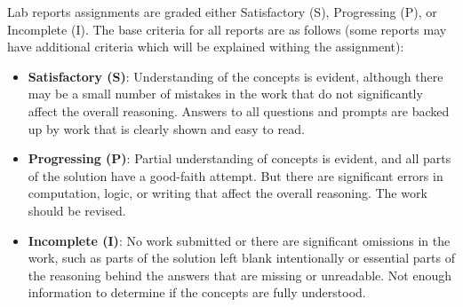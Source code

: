 Lab reports assignments are graded either Satisfactory (S), Progressing
(P), or Incomplete (I). The base criteria for all reports are as follows
(some reports may have additional criteria which will be explained
withing the assignment):

\begin{itemize}
\tightlist
\item
  \textbf{Satisfactory (S)}: Understanding of the concepts is evident,
  although there may be a small number of mistakes in the work that do
  not significantly affect the overall reasoning. Answers to all
  questions and prompts are backed up by work that is clearly shown and
  easy to read.
\item
  \textbf{Progressing (P)}: Partial understanding of concepts is
  evident, and all parts of the solution have a good-faith attempt. But
  there are significant errors in computation, logic, or writing that
  affect the overall reasoning. The work should be revised.
\item
  \textbf{Incomplete (I)}: No work submitted or there are significant
  omissions in the work, such as parts of the solution left blank
  intentionally or essential parts of the reasoning behind the answers
  that are missing or unreadable. Not enough information to determine if
  the concepts are fully understood.
\end{itemize}
